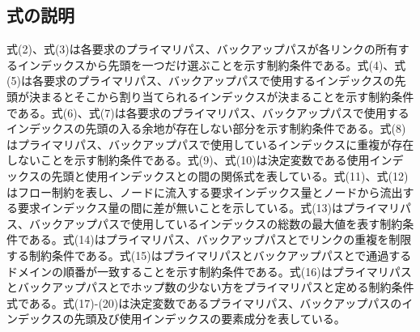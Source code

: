 \documentclass[a4j,twocolumn,fleqn]{jarticle}
\begin{document}
\subsection{式の説明}
式(2)、式(3)は各要求のプライマリパス、バックアップパスが各リンクの所有するインデックスから先頭を一つだけ選ぶことを示す制約条件である。式(4)、式(5)は各要求のプライマリパス、バックアップパスで使用するインデックスの先頭が決まるとそこから割り当てられるインデックスが決まることを示す制約条件である。式(6)、式(7)は各要求のプライマリパス、バックアップパスで使用するインデックスの先頭の入る余地が存在しない部分を示す制約条件である。式(8)はプライマリパス、バックアップパスで使用しているインデックスに重複が存在しないことを示す制約条件である。式(9)、式(10)は決定変数である使用インデックスの先頭と使用インデックスとの間の関係式を表している。式(11)、式(12)はフロー制約を表し、ノードに流入する要求インデックス量とノードから流出する要求インデックス量の間に差が無いことを示している。式(13)はプライマリパス、バックアップパスで使用しているインデックスの総数の最大値を表す制約条件である。式(14)はプライマリパス、バックアップパスとでリンクの重複を制限する制約条件である。式(15)はプライマリパスとバックアップパスとで通過するドメインの順番が一致することを示す制約条件である。式(16)はプライマリパスとバックアップパスとでホップ数の少ない方をプライマリパスと定める制約条件式である。式(17)-(20)は決定変数であるプライマリパス、バックアップパスのインデックスの先頭及び使用インデックスの要素成分を表している。
\end{document}
